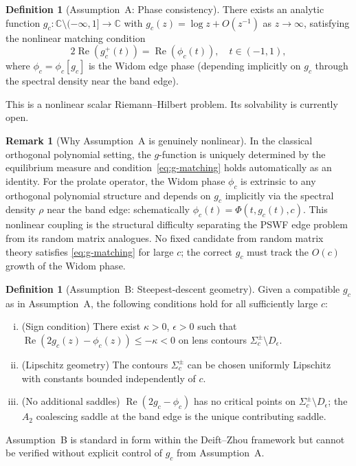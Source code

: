 \documentclass[12pt,a4paper]{amsart}
\theoremstyle{definition}
\newtheorem{definition}[theorem]{Definition}
\newtheorem{remark}[theorem]{Remark}
\begin{document}
\begin{center}
\end{center}

\medskip

\begin{definition}[Assumption~A: Phase consistency]\label{ass:A}
There exists an analytic function
$g_c:\mathbb{C}\setminus(-\infty,1]\to\mathbb{C}$
with $g_c(z) = \log z + O(z^{-1})$ as $z\to\infty$,
satisfying the nonlinear matching condition
\begin{equation}\label{eq:g-matching}
  2\operatorname{Re}(g_c^+(t))
  = \operatorname{Re}(\phi_c(t)),
  \quad t\in(-1,1),
\end{equation}
where $\phi_c = \phi_c[g_c]$ is the Widom edge phase
(depending implicitly on $g_c$ through the spectral density
near the band edge).

This is a nonlinear scalar Riemann--Hilbert problem.
Its solvability is currently open.
\end{definition}

\begin{remark}[Why Assumption~A is genuinely nonlinear]
In the classical orthogonal polynomial setting, the $g$-function
is uniquely determined by the equilibrium measure and
condition~\eqref{eq:g-matching} holds automatically as an identity.
For the prolate operator, the Widom phase $\phi_c$ is extrinsic
to any orthogonal polynomial structure and depends on $g_c$
implicitly via the spectral density $\rho$ near the band edge:
schematically $\phi_c(t) = \Phi(t, g_c(t), c)$.
This nonlinear coupling is the structural difficulty separating
the PSWF edge problem from its random matrix analogues.
No fixed candidate from random matrix theory satisfies
\eqref{eq:g-matching} for large $c$; the correct $g_c$ must
track the $O(c)$ growth of the Widom phase.
\end{remark}

\begin{definition}[Assumption~B: Steepest-descent geometry]\label{ass:B}
Given a compatible $g_c$ as in Assumption~A, the following
conditions hold for all sufficiently large $c$:
\begin{enumerate}[(i)]
  \item (Sign condition) There exist $\kappa>0$, $\epsilon>0$ such that
  $\operatorname{Re}(2g_c(z)-\phi_c(z)) \le -\kappa < 0$
  on lens contours $\Sigma_c^\pm \setminus D_\epsilon$.
  \item (Lipschitz geometry) The contours $\Sigma_c^\pm$ can be chosen
  uniformly Lipschitz with constants bounded independently of $c$.
  \item (No additional saddles)
  $\operatorname{Re}(2g_c-\phi_c)$ has no critical points on
  $\Sigma_c^\pm\setminus D_\epsilon$; the $A_2$ coalescing saddle
  at the band edge is the unique contributing saddle.
\end{enumerate}
Assumption~B is standard in form within the Deift--Zhou framework
but cannot be verified without explicit control of $g_c$
from Assumption~A.
\end{definition}
\end{document}
